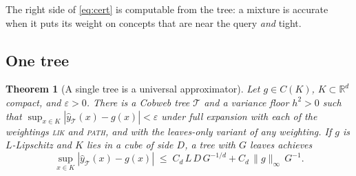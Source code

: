 \documentclass[11pt]{article}
\newtheorem{theorem}{Theorem}
\theoremstyle{definition}
\theoremstyle{remark}
\newcommand{\R}{\mathbb{R}}
\newcommand{\T}{\mathcal{T}}
\newcommand{\hy}{\hat{y}}
\begin{document}
The right side of \eqref{eq:cert} is computable from the tree: a mixture is accurate
when it puts its weight on concepts that are near the query \emph{and} tight.

\subsection{One tree}

\begin{theorem}[A single tree is a universal approximator]\label{thm:single}
Let $g\in C(K)$, $K\subset\R^d$ compact, and $\varepsilon>0$.  There is a Cobweb tree $\T$
and a variance floor $h^2>0$ such that $\sup_{x\in K}|\hy_\T(x)-g(x)|<\varepsilon$ under
full expansion with each of the weightings \textsc{lik} and \textsc{path}, and with the
leaves-only variant of any weighting.  If $g$ is $L$-Lipschitz and $K$ lies in a cube of side $D$, a tree with $G$ leaves
achieves
\begin{equation}\label{eq:singlerate}
  \sup_{x\in K}|\hy_\T(x)-g(x)|\;\le\;C_{d}\,L\,D\,G^{-1/d}+C_{d}\,\|g\|_\infty\,G^{-1}.
\end{equation}
\end{theorem}
\end{document}
